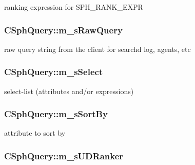 ranking expression for S\-P\-H\-\_\-\-R\-A\-N\-K\-\_\-\-E\-X\-P\-R 

\hypertarget{classCSphQuery_a2d086a1ba48cad3f3ca95f34d86a24e3}{
\subsubsection[{m\-\_\-s\-Raw\-Query}]{ C\-Sph\-Query\-::m\-\_\-s\-Raw\-Query}}\label{classCSphQuery_a2d086a1ba48cad3f3ca95f34d86a24e3}


raw query string from the client for searchd log, agents, etc 

\hypertarget{classCSphQuery_a6376053048cd37a5fbceb32b636a9051}{
\subsubsection[{m\-\_\-s\-Select}]{ C\-Sph\-Query\-::m\-\_\-s\-Select}}\label{classCSphQuery_a6376053048cd37a5fbceb32b636a9051}


select-\/list (attributes and/or expressions) 

\hypertarget{classCSphQuery_a2bc9ee6fd6cfb8756b441d55ff95c3c0}{
\subsubsection[{m\-\_\-s\-Sort\-By}]{ C\-Sph\-Query\-::m\-\_\-s\-Sort\-By}}\label{classCSphQuery_a2bc9ee6fd6cfb8756b441d55ff95c3c0}


attribute to sort by 

\hypertarget{classCSphQuery_a2bc7044d50dffe9b164caf1b92ea904c}{
\subsubsection[{m\-\_\-s\-U\-D\-Ranker}]{ C\-Sph\-Query\-::m\-\_\-s\-U\-D\-Ranker}}\label{classCSphQuery_a2bc7044d50dffe9b164caf1b92ea904c}


